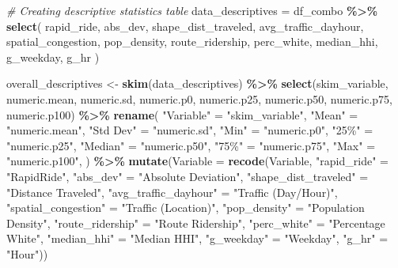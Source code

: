 \documentclass[
  12pt,
]{article}
\newenvironment{Shaded}{\begin{snugshade}}{\end{snugshade}}
\newcommand{\AttributeTok}[1]{\textcolor[rgb]{0.13,0.29,0.53}{#1}}
\newcommand{\CommentTok}[1]{\textcolor[rgb]{0.56,0.35,0.01}{\textit{#1}}}
\newcommand{\FunctionTok}[1]{\textcolor[rgb]{0.13,0.29,0.53}{\textbf{#1}}}
\newcommand{\NormalTok}[1]{#1}
\newcommand{\OtherTok}[1]{\textcolor[rgb]{0.56,0.35,0.01}{#1}}
\newcommand{\SpecialCharTok}[1]{\textcolor[rgb]{0.81,0.36,0.00}{\textbf{#1}}}
\newcommand{\StringTok}[1]{\textcolor[rgb]{0.31,0.60,0.02}{#1}}
\begin{document}
\begin{Shaded}
\begin{Highlighting}[]
\CommentTok{\# Creating descriptive statistics table}
\NormalTok{data\_descriptives }\OtherTok{=}\NormalTok{ df\_combo }\SpecialCharTok{\%\textgreater{}\%}
  \FunctionTok{select}\NormalTok{(}
\NormalTok{    rapid\_ride, }
\NormalTok{    abs\_dev,}
\NormalTok{    shape\_dist\_traveled, }
\NormalTok{    avg\_traffic\_dayhour, }
\NormalTok{    spatial\_congestion,}
\NormalTok{    pop\_density,}
\NormalTok{    route\_ridership,}
\NormalTok{    perc\_white,}
\NormalTok{    median\_hhi,}
\NormalTok{    g\_weekday, }
\NormalTok{    g\_hr}
\NormalTok{  )}

\NormalTok{overall\_descriptives }\OtherTok{\textless{}{-}} \FunctionTok{skim}\NormalTok{(data\_descriptives) }\SpecialCharTok{\%\textgreater{}\%}
  \FunctionTok{select}\NormalTok{(skim\_variable,}
\NormalTok{         numeric.mean,}
\NormalTok{         numeric.sd,}
\NormalTok{         numeric.p0,}
\NormalTok{         numeric.p25,}
\NormalTok{         numeric.p50,}
\NormalTok{         numeric.p75,}
\NormalTok{         numeric.p100) }\SpecialCharTok{\%\textgreater{}\%}
  \FunctionTok{rename}\NormalTok{(}
    \StringTok{"Variable"} \OtherTok{=} \StringTok{"skim\_variable"}\NormalTok{,}
    \StringTok{"Mean"} \OtherTok{=} \StringTok{"numeric.mean"}\NormalTok{,}
    \StringTok{"Std Dev"} \OtherTok{=} \StringTok{"numeric.sd"}\NormalTok{,}
    \StringTok{"Min"} \OtherTok{=} \StringTok{"numeric.p0"}\NormalTok{,}
    \StringTok{"25\%"} \OtherTok{=} \StringTok{"numeric.p25"}\NormalTok{,}
    \StringTok{"Median"} \OtherTok{=} \StringTok{"numeric.p50"}\NormalTok{,}
    \StringTok{"75\%"} \OtherTok{=} \StringTok{"numeric.p75"}\NormalTok{,}
    \StringTok{"Max"} \OtherTok{=} \StringTok{"numeric.p100"}\NormalTok{,}
\NormalTok{  ) }\SpecialCharTok{\%\textgreater{}\%}
  \FunctionTok{mutate}\NormalTok{(}\AttributeTok{Variable =} \FunctionTok{recode}\NormalTok{(Variable,}
                           \StringTok{"rapid\_ride"} \OtherTok{=} \StringTok{"RapidRide"}\NormalTok{,}
                           \StringTok{"abs\_dev"} \OtherTok{=} \StringTok{"Absolute Deviation"}\NormalTok{,}
                           \StringTok{"shape\_dist\_traveled"} \OtherTok{=} \StringTok{"Distance Traveled"}\NormalTok{,}
                           \StringTok{"avg\_traffic\_dayhour"} \OtherTok{=} \StringTok{"Traffic (Day/Hour)"}\NormalTok{,}
                           \StringTok{"spatial\_congestion"} \OtherTok{=} \StringTok{"Traffic (Location)"}\NormalTok{,}
                           \StringTok{"pop\_density"} \OtherTok{=} \StringTok{"Population Density"}\NormalTok{,}
                           \StringTok{"route\_ridership"} \OtherTok{=} \StringTok{"Route Ridership"}\NormalTok{,}
                           \StringTok{"perc\_white"} \OtherTok{=} \StringTok{"Percentage White"}\NormalTok{,}
                           \StringTok{"median\_hhi"} \OtherTok{=} \StringTok{"Median HHI"}\NormalTok{,}
                           \StringTok{"g\_weekday"} \OtherTok{=} \StringTok{"Weekday"}\NormalTok{,}
                           \StringTok{"g\_hr"} \OtherTok{=} \StringTok{"Hour"}\NormalTok{))}
\end{Highlighting}
\end{Shaded}
\end{document}
